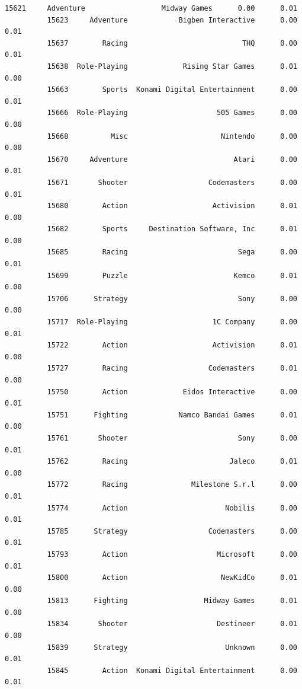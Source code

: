 \documentclass[11pt]{article}
\begin{document}
\begin{Verbatim}[commandchars=\\\{\}]
          15621     Adventure                  Midway Games      0.00      0.01   
          15623     Adventure            Bigben Interactive      0.00      0.01   
          15637        Racing                           THQ      0.00      0.01   
          15638  Role-Playing             Rising Star Games      0.01      0.00   
          15663        Sports  Konami Digital Entertainment      0.00      0.01   
          15666  Role-Playing                     505 Games      0.00      0.00   
          15668          Misc                      Nintendo      0.00      0.00   
          15670     Adventure                         Atari      0.00      0.01   
          15671       Shooter                   Codemasters      0.00      0.01   
          15680        Action                    Activision      0.01      0.00   
          15682        Sports     Destination Software, Inc      0.01      0.00   
          15685        Racing                          Sega      0.00      0.01   
          15699        Puzzle                         Kemco      0.01      0.00   
          15706      Strategy                          Sony      0.00      0.00   
          15717  Role-Playing                    1C Company      0.00      0.01   
          15722        Action                    Activision      0.01      0.00   
          15727        Racing                   Codemasters      0.01      0.00   
          15750        Action             Eidos Interactive      0.00      0.01   
          15751      Fighting            Namco Bandai Games      0.01      0.00   
          15761       Shooter                          Sony      0.00      0.01   
          15762        Racing                        Jaleco      0.01      0.00   
          15772        Racing               Milestone S.r.l      0.00      0.01   
          15774        Action                       Nobilis      0.00      0.01   
          15785      Strategy                   Codemasters      0.00      0.01   
          15793        Action                     Microsoft      0.00      0.01   
          15800        Action                      NewKidCo      0.01      0.00   
          15813      Fighting                  Midway Games      0.01      0.00   
          15834       Shooter                     Destineer      0.01      0.00   
          15839      Strategy                       Unknown      0.00      0.01   
          15845        Action  Konami Digital Entertainment      0.00      0.01   
          

\end{Verbatim}
\end{document}

